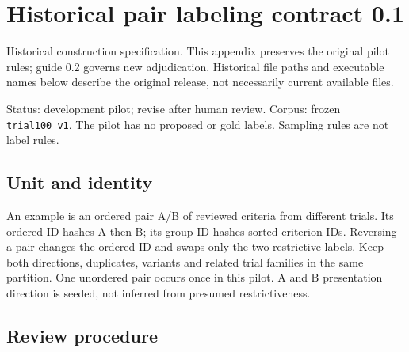 \documentclass[10pt,letterpaper]{article}
\newcommand{\pathcode}[1]{\nolinkurl{#1}}
\begin{document}
\section{Historical pair labeling contract 0.1}\label{contract01-historical-pair-labeling-contract-01}\label{sec:labelingcontract01}

Historical construction specification. This appendix preserves the original pilot rules; guide 0.2 governs new adjudication. Historical file paths and executable names below describe the original release, not necessarily current available files.

Status: development pilot; revise after human review. Corpus: frozen \pathcode{trial100_v1}. The pilot has no proposed or gold labels. Sampling rules are not label rules.

\subsection{Unit and identity}\label{contract01-unit-and-identity}

An example is an ordered pair A/B of reviewed criteria from different trials. Its ordered ID hashes A then B; its group ID hashes sorted criterion IDs. Reversing a pair changes the ordered ID and swaps only the two restrictive labels. Keep both directions, duplicates, variants and related trial families in the same partition. One unordered pair occurs once in this pilot. A and B presentation direction is seeded, not inferred from presumed restrictiveness.

\subsection{Review procedure}\label{contract01-review-procedure}
\end{document}
